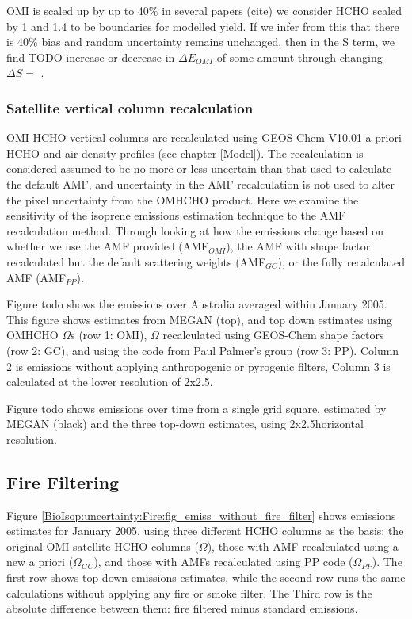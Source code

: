       OMI is scaled up by up to 40\% in several papers (cite) we consider HCHO scaled by 1 and 1.4 to be boundaries for modelled yield.
      If we infer from this that there is 40\% bias and random uncertainty remains unchanged, then in the S term, we find TODO increase or decrease in $\Delta{E_{OMI}}$ of some amount through changing $\Delta{S}=$ .
    
    
    \subsubsection{Satellite vertical column recalculation}
      \label{BioIsop:uncertainty:Satellite:AMF}
      OMI HCHO vertical columns are recalculated using GEOS-Chem V10.01 a priori HCHO and air density profiles (see chapter \ref{Model}).
      The recalculation is considered assumed to be no more or less uncertain than that used to calculate the default AMF, and uncertainty in the AMF recalculation is not used to alter the pixel uncertainty from the OMHCHO product.
      Here we examine the sensitivity of the isoprene emissions estimation technique to the AMF recalculation method.
      Through looking at how the emissions change based on whether we use the AMF provided (AMF$_{OMI}$), the AMF with shape factor recalculated but the default scattering weights (AMF$_{GC}$), or the fully recalculated AMF (AMF$_{PP}$).
      
      Figure todo shows the emissions over Australia averaged within January 2005.
      This figure shows estimates from MEGAN (top), and top down estimates using OMHCHO $\Omega$s (row 1: OMI), $\Omega$ recalculated using GEOS-Chem shape factors (row 2: GC), and using the code from Paul Palmer's group (row 3: PP).
      Column 2 is emissions without applying anthropogenic or pyrogenic filters, Column 3 is calculated at the lower resolution of 2x2.5\degr.
      
      Figure todo shows emissions over time from a single grid square, estimated by MEGAN (black) and the three top-down estimates, using 2x2.5\degr horizontal resolution.
  
  \subsection{Fire Filtering}
    
    Figure \ref{BioIsop:uncertainty:Fire:fig_emiss_without_fire_filter} shows emissions estimates for January 2005, using three different HCHO columns as the basis: the original OMI satellite HCHO columns ($\Omega$), those with AMF recalculated using a new a priori ($\Omega_{GC}$), and those with AMFs recalculated using PP code ($\Omega_{PP}$).
    The first row shows top-down emissions estimates, while the second row runs the same calculations without applying any fire or smoke filter.
    The Third row is the absolute difference between them: fire filtered minus standard emissions.
    
